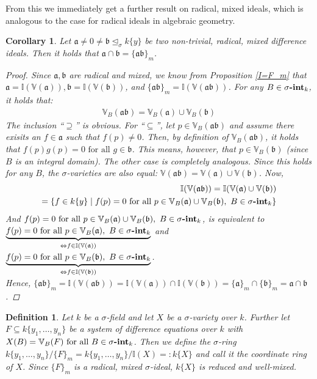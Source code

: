 \documentclass{article}
\def\I{\mathbb{I}}
\def\VV{\mathbb{V}}
\def\a{\mathfrak{a}}
\def\b{\mathfrak{b}}
\def\s{\sigma}
\def\si{\unlhd_{\sigma}}
\def\fa{\text{ for all }}
\newcommand{\catname}[1]{{\normalfont\textbf{#1}}}
\newcommand{\sintk}{\s\text{\catname{-int}}_k}
\newenvironment{bew}{\begin{proof}[Proof]}{\end{proof}}
\theoremstyle{plain}
\newtheorem{cor}[Satz]{Corollary}
\newtheorem{defn}[Satz]{Definition}
\theoremstyle{definition}
\begin{document}
From this we immediately get a further result on radical, mixed ideals, which is analogous to the case for radical ideals in algebraic geometry.
\begin{cor}\label{prod=cap}
Let $\a \neq 0 \neq \b \si k\{y\}$ be two non-trivial, radical, mixed difference ideals. Then it holds that $\a \cap \b = \{ \a \b \}_m$.
\begin{bew}
Since $\a, \b$ are radical and mixed, we know from Proposition \ref{I=F_m} that $\a = \I(\VV(\a)), \b = \I(\VV(\b))$, and $\{ \a \b \}_m = \I( \VV( \a \b ))$.
For any $B \in \sintk$, it holds that:
\begin{align*} \VV_B( \a \b) = \VV_B( \a) \cup \VV_B( \b) \end{align*}
The inclusion ``$\supseteq$'' is obvious. For ``$\subseteq$'', let $p \in \VV_B(\a\b)$ and assume there exisits an $f \in \a$ such that $f(p) \neq 0$.
Then, by definition of $\VV_B(\a\b)$, it holds that $f(p)g(p) = 0 \fa g \in \b$. This means, however, that $p \in \VV_B(\b)$ (since $B$ is an integral domain). The other case is completely analogous.
Since this holds for any $B$, the $\s$-varieties are also equal: $\VV( \a \b) = \VV( \a) \cup \VV( \b)$. Now,
\begin{align*} \I(\VV(\a \b)) = \I(\VV(\a) \cup \VV(\b)) \\ = \{ f \in k\{y\} \mid f(p) = 0 \fa p \in \VV_B(\a) \cup \VV_B(\b), ~ B \in \sintk \} \end{align*}
And $f(p) = 0 \fa p \in \VV_B(\a) \cup \VV_B(\b), ~ B \in \sintk$, is equivalent to \\
$ \underbrace{f(p) = 0 \fa p \in \VV_B(\a), ~ B \in \sintk}_{\Leftrightarrow f \in \I(\VV(\a))}$ and $ \underbrace{f(p) = 0 \fa p \in \VV_B(\b), ~ B \in \sintk}_{\Leftrightarrow f \in \I(\VV(\b))}$. \\
Hence, $\{\a\b\}_m = \I(\VV( \a \b)) = \I(\VV(\a)) \cap \I(\VV(\b)) = \{\a\}_m \cap \{\b\}_m = \a \cap \b$.
\end{bew}
\end{cor}

\begin{defn}
Let $k$ be a $\s$-field and let $X$ be a $\s$-variety over $k$. Further let $F \subseteq k\{y_1, \ldots, y_n\}$ be a system of difference equations over $k$ with $X(B) = \VV_B(F) \fa B \in \sintk$.
Then we define the $\s$-ring $k\{y_1, \ldots, y_n\}/\{F\}_m = k\{y_1, \ldots, y_n\}/\I(X) =: k\{X\}$ and call it the \emph{coordinate ring} of $X$. Since $\{F\}_m$ is a radical, mixed $\s$-ideal, $k\{X\}$ is reduced and well-mixed. 
\end{defn}
\end{document}
